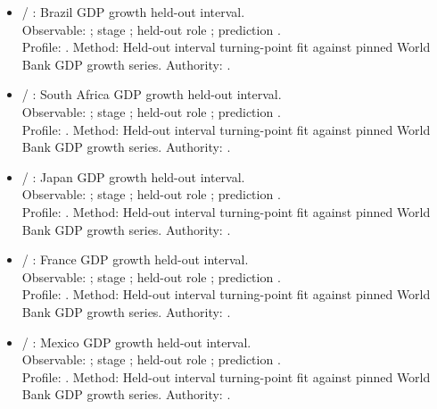 \begin{itemize}
\item {} / : Brazil GDP growth held-out interval.\\ Observable: ; stage ; held-out role ; prediction .\\ Profile: . Method: Held-out interval turning-point fit against pinned World Bank GDP growth series. Authority: .
\item {} / : South Africa GDP growth held-out interval.\\ Observable: ; stage ; held-out role ; prediction .\\ Profile: . Method: Held-out interval turning-point fit against pinned World Bank GDP growth series. Authority: .
\item {} / : Japan GDP growth held-out interval.\\ Observable: ; stage ; held-out role ; prediction .\\ Profile: . Method: Held-out interval turning-point fit against pinned World Bank GDP growth series. Authority: .
\item {} / : France GDP growth held-out interval.\\ Observable: ; stage ; held-out role ; prediction .\\ Profile: . Method: Held-out interval turning-point fit against pinned World Bank GDP growth series. Authority: .
\item {} / : Mexico GDP growth held-out interval.\\ Observable: ; stage ; held-out role ; prediction .\\ Profile: . Method: Held-out interval turning-point fit against pinned World Bank GDP growth series. Authority: .

\end{itemize}

